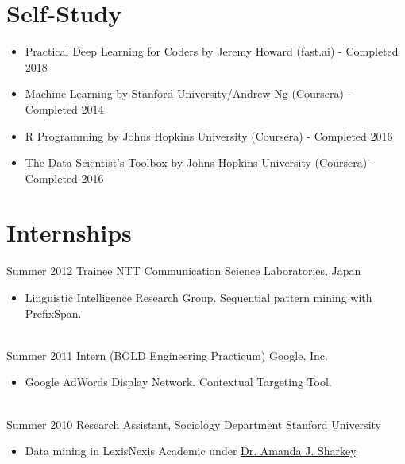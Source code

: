 \documentclass[letterpaper]{twentysecondcv} %
\begin{document}

\section{Self-Study}
\begin{itemize} \itemsep -2pt %
        \item Practical Deep Learning for Coders by Jeremy Howard (fast.ai) - {\footnotesize{Completed 2018}}
        \item Machine Learning by Stanford University/Andrew Ng (Coursera) - {\footnotesize{Completed 2014}}
       	\item R Programming by Johns Hopkins University (Coursera) - {\footnotesize{Completed 2016}}
        \item The Data Scientist's Toolbox by Johns Hopkins University (Coursera) - {\footnotesize{Completed 2016}}
\end{itemize}


\section{Internships}
\begin{twenty}
	\twentyitem
    	{Summer}
        {2012}
        {Trainee}
        {\href{http://www.kecl.ntt.co.jp/rps/index.html}{NTT Communication Science Laboratories}, Japan}
        {}
        {\begin{itemize} \itemsep -2pt %
        \item Linguistic Intelligence Research Group. Sequential pattern mining with PrefixSpan.
        \end{itemize}}
    \\
    \twentyitem
    	{Summer}
        {2011}
        {Intern (BOLD Engineering Practicum)}
        {Google, Inc.}
        {}
        {\begin{itemize}  \itemsep -2pt %
        \item Google AdWords Display Network. Contextual Targeting Tool.
        \end{itemize}}
    \\
    \twentyitem
    	{Summer}
        {2010}
        {Research Assistant, Sociology Department}
        {Stanford University}
        {}
        {\begin{itemize}  \itemsep -2pt %
        \item Data mining in LexisNexis Academic under \href{https://www.chicagobooth.edu/faculty/directory/s/amanda-j-sharkey}{Dr. Amanda J. Sharkey}.
        \end{itemize} }
\end{twenty}
\end{document}
